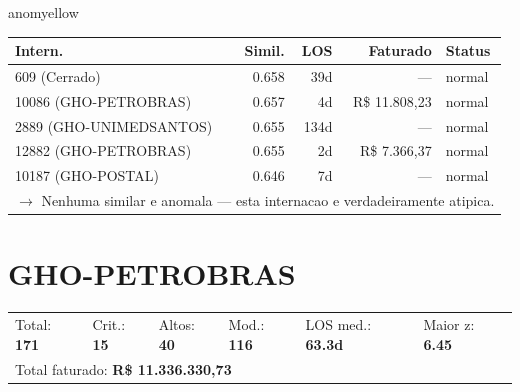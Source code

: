 \documentclass[a4paper,10pt]{article}
\begin{document}
\begin{anomalycard}[Internacao 747 | GHO-MEDTOUR | MODERADO (z=2.16)]{anomyellow}
\begin{tabular}{l r r r l}\toprule\textbf{Intern.} & \textbf{Simil.} & \textbf{LOS} & \textbf{Faturado} & \textbf{Status} \\\midrule
609 (Cerrado) & 0.658 & 39d & --- & \textcolor{jcubeblue}{normal} \\
10086 (GHO-PETROBRAS) & 0.657 & 4d & R\$ 11.808,23 & \textcolor{jcubeblue}{normal} \\
2889 (GHO-UNIMEDSANTOS) & 0.655 & 134d & --- & \textcolor{jcubeblue}{normal} \\
12882 (GHO-PETROBRAS) & 0.655 & 2d & R\$ 7.366,37 & \textcolor{jcubeblue}{normal} \\
10187 (GHO-POSTAL) & 0.646 & 7d & --- & \textcolor{jcubeblue}{normal} \\
\multicolumn{5}{l}{\textcolor{jcubeblue}{\small $\rightarrow$ Nenhuma similar e anomala --- esta internacao e verdadeiramente atipica.}} \\
\bottomrule\end{tabular}


\end{anomalycard}

\newpage

\clearpage
\section{GHO-PETROBRAS}
\begin{tcolorbox}[colback=lightblue,colframe=jcubeblue,title={\textbf{Resumo --- GHO-PETROBRAS}}]
\begin{tabular}{ll@{\quad}ll@{\quad}ll}
Total: \textbf{171} &
Crit.: \textcolor{anomred}{\textbf{15}} &
Altos: \textcolor{anomorange}{\textbf{40}} &
Mod.: \textcolor{anomyellow}{\textbf{116}} &
LOS med.: \textbf{63.3d} &
Maior z: \textbf{6.45} \\

\multicolumn{6}{l}{Total faturado: \textbf{R\$ 11.336.330,73}} \\

\end{tabular}
\end{tcolorbox}
\end{document}
